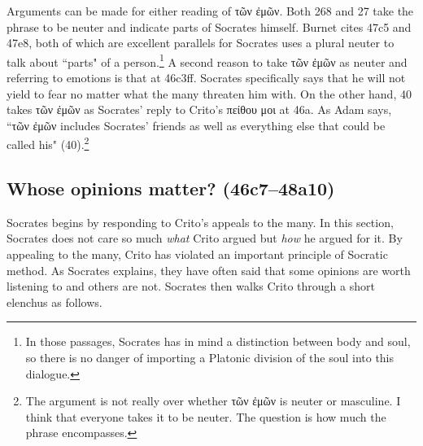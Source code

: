 \documentclass[11pt]{article}
\begin{document}
Arguments can be made for either reading of {\g τῶν ἐμῶν}. Both
\citet{burnet1924} 268 and \citet{rose1983} 27 take the phrase to be neuter
and indicate parts of Socrates himself.  Burnet cites 47c5 and 47e8, both
of which are excellent parallels for Socrates uses a plural neuter to talk
about ``parts" of a person.\footnote{In those passages, Socrates has in
mind a distinction between body and soul, so there is no danger of
importing a Platonic division of the soul into this dialogue.}  A second
reason to take {\g τῶν ἐμῶν} as neuter and referring to emotions is that at
46c3ff. Socrates specifically says that he will not yield to fear no matter
what the many threaten him with.  On the other hand, \citet{adam1988} 40
takes {\g τῶν ἐμῶν} as Socrates' reply to Crito's {\g πείθου μοι} at 46a.
As Adam says, ``{\g τῶν ἐμῶν} includes Socrates' friends as well as
everything else that could be called his" (40).\footnote{The argument is
not really over whether {\g τῶν ἐμῶν} is neuter or masculine.  I think
that everyone takes it to be neuter.  The question is how much the phrase
encompasses.}


\subsection{Whose opinions matter? (46c7--48a10)}

Socrates begins by responding to Crito's appeals to the many.  In this
section, Socrates does not care so much \emph{what} Crito argued but
\emph{how} he argued for it.  By appealing to the many, Crito has violated
an important principle of Socratic method.  As Socrates explains, they have
often said that some opinions are worth listening to and others are not.
Socrates then walks Crito through a short elenchus as follows.
\end{document}
